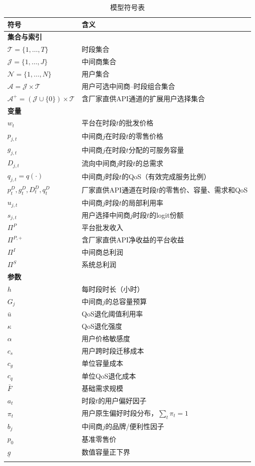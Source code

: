 \documentclass[UTF8,11pt]{ctexart}
\newcommand{\qos}{q}
\newcommand{\T}{\mathcal{T}}
\newcommand{\J}{\mathcal{J}}
\newcommand{\N}{\mathcal{N}}
\newcommand{\A}{\mathcal{A}}
\newcommand{\D}{D}
\begin{document}
\begin{longtable}{@{}p{}p{}@{}}
\toprule
符号 & 含义 \\
\midrule
\endhead
\multicolumn{2}{l}{\textbf{集合与索引}} \\
$\T=\{1,\ldots,T\}$ & 时段集合 \\
$\J=\{1,\ldots,J\}$ & 中间商集合 \\
$\N=\{1,\ldots,N\}$ & 用户集合 \\
$\A=\J\times\T$ & 用户可选中间商--时段组合集合 \\
$\A^+=(\J\cup\{0\})\times\T$ & 含厂家直供API通道的扩展用户选择集合 \\
\midrule
\multicolumn{2}{l}{\textbf{变量}} \\
$w_t$ & 平台在时段$t$的批发价格 \\
$p_{j,t}$ & 中间商$j$在时段$t$的零售价格 \\
$g_{j,t}$ & 中间商$j$在时段$t$分配的可服务容量 \\
$\D_{j,t}$ & 流向中间商$j$时段$t$的总需求 \\
$q_{j,t}=\qos(\cdot)$ & 中间商$j$时段$t$的QoS（有效完成服务比例） \\
$p^D_t,g^D_t,\D^D_t,q^D_t$ & 厂家直供API通道在时段$t$的零售价、容量、需求和QoS \\
$u_{j,t}$ & 中间商$j$时段$t$的局部利用率 \\
$s_{j,t}$ & 用户选择中间商$j$时段$t$的logit份额 \\
$\Pi^P$ & 平台批发收入 \\
$\Pi^{P,+}$ & 含厂家直供API净收益的平台收益 \\
$\Pi^I$ & 中间商总利润 \\
$\Pi^S$ & 系统总利润 \\
\midrule
\multicolumn{2}{l}{\textbf{参数}} \\
$h$ & 每时段时长（小时） \\
$G_j$ & 中间商$j$的总容量预算 \\
$\bar u$ & QoS退化阈值利用率 \\
$\kappa$ & QoS退化强度 \\
$\alpha$ & 用户价格敏感度 \\
$c_s$ & 用户跨时段迁移成本 \\
$c_g$ & 单位容量成本 \\
$c_q$ & 单位QoS退化成本 \\
$\bar F$ & 基础需求规模 \\
$a_t$ & 时段$t$的用户偏好因子 \\
$\pi_t$ & 用户原生偏好时段分布，$\sum_t\pi_t=1$ \\
$b_j$ & 中间商$j$的品牌/便利性因子 \\
$p_0$ & 基准零售价 \\
$\underline g$ & 数值容量正下界 \\
\bottomrule
\caption{模型符号表}
\label{tab:nomenclature}
\end{longtable}
\end{document}
